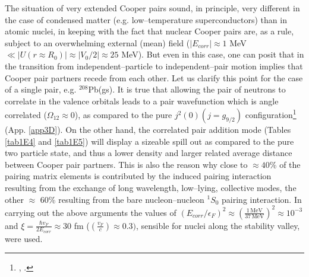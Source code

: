 The situation of very extended Cooper pairs sound, in principle, very different in the case of condensed matter (e.g. low--temperature superconductors) than in atomic nuclei, in keeping with the fact that nuclear Cooper pairs are, as a rule, subject to an overwhelming external (mean) field ($|E_{corr}|\approx 1$ MeV $\ll |U(r\approx R_0)|\approx |V_0/2|\approx 25 $ MeV). But even in this case, one can posit that in the transition from independent--particle to independent--pair motion implies that Cooper pair partners recede from each other. Let us clarify this point for the case of a single pair, e.g. $^{208}$Pb(gs). It is true that allowing the pair of neutrons to correlate in the valence orbitals leads to a pair wavefunction which is angle correlated ($\Omega_{12}\approx 0$), as compared to the pure $j^2(0)(j=g_{9/2})$ configuration\footnote{\cite{Bertsch:67}, \cite{Ferreira:84,Matsuo:13}.} (App. \ref{app3D}). On the other hand, the correlated pair addition mode (Tables \ref{tab1E4} and \ref{tab1E5}) will display a sizeable spill out as compared to the pure two particle state, and thus a lower density and larger related average distance between Cooper pair partners. This is also the reason why close to $\approx 40$\% of the pairing matrix elements is contributed by the induced pairing interaction resulting from the exchange of long wavelength, low--lying, collective modes, the other $\approx$ 60\% resulting from the bare nucleon--nucleon $^1S_0$ pairing interaction. In carrying out the above arguments the values of $(E_{corr}/\epsilon_F)^2\approx \left(\frac{1 \,\text{MeV}}{37\,\text{MeV}}\right)^2\approx 10^{-3}$ and $\xi=\frac{\hbar v_F}{2E_{corr}}\approx 30$ fm ($(\frac{v_F}{c})\approx 0.3)$, sensible for nuclei along the stability valley, were used.


